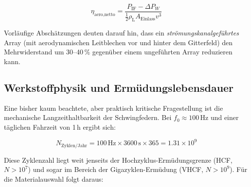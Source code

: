 ﻿\documentclass[12pt, a4paper]{report}
\theoremstyle{definition}
\theoremstyle{remark}
\newcommand{\rhoL}{\rho_{\text{L}}}
\newcommand{\Aeinlass}{A_{\text{Einlass}}}
\begin{document}
\begin{equation}
  \eta_{\text{aero,netto}} = \frac{P_{\text{IF}} - \Delta P_W}{\frac{1}{2}\rhoL \Aeinlass v^3}
  \label{eq:eta_aero_netto}
\end{equation}

Vorläufige Abschätzungen deuten darauf hin, dass ein \emph{strömungskanal\-geführtes}
Array (mit aerodynamischen Leitblechen vor und hinter dem Gitterfeld) den
Mehrwiderstand um 30--40\,\% gegenüber einem ungeführten Array reduzieren kann.

\subsection{Werkstoffphysik und Ermüdungslebensdauer}
\label{ssec:ausblick_ermuedung}

Eine bisher kaum beachtete, aber praktisch kritische Fragestellung ist die
mechanische Langzeit\-haltbarkeit der Schwingfedern. Bei $f_0 \approx 100\,\text{Hz}$
und einer täglichen Fahrzeit von 1\,h ergibt sich:

\begin{equation}
  N_{\text{Zyklen/Jahr}} = 100\,\text{Hz} \times 3600\,\text{s} \times 365 = 1.31 \times 10^9
  \label{eq:n_zyklen}
\end{equation}

Diese Zyklenzahl liegt weit jenseits der Hochzyklus-Ermüdungsgrenze (HCF,
$N > 10^7$) und sogar im Bereich der Gigazyklen-Ermüdung (VHCF,
$N > 10^9$). Für die Materialauswahl folgt daraus:
\end{document}
